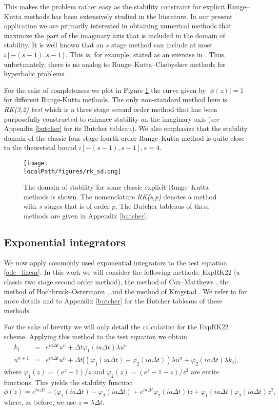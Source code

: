 This makes the problem rather easy as the stability constraint for explicit Runge--Kutta methods has been extensively studied in the literature. In our present application we are primarily interested in obtaining numerical methods that maximize the part of the imaginary axis that is included in the domain of stability. It is well known that an $s$ stage method can include at most $i [-(s-1),s-1]$. This is, for example, stated as an exercise in \cite[Chapter. IV.2, exercise 3]{Hairer:1996}. Thus, unfortunately, there is no analog to Runge--Kutta--Chebyshev methods for hyperbolic problems.

For the sake of completeness we plot in Figure \ref{fig:RK_sd2} the curve given by $|\phi(z)| = 1$ for different Runge-Kutta methods. 
The only non-standard method here is \textit{RK(3,2) best} which is a three stage second order method that has been purposefully constructed to enhance stability on the imaginary axis (see Appendix \ref{butcher} for its Butcher tableau). We also emphasize that the stability domain of the classic four stage fourth order Runge--Kutta method is quite close to the theoretical bound $i [-(s-1),s-1], s=4$.

\begin{figure}[h]
	\centering
	\texttt{[image: \\localPath/figures/rk\_sd.png]}
    \caption{The domain of stability for some classic explicit Runge--Kutta methods is shown. The nomenclature \textit{RK(s,p)} denotes a method with $s$ stages that is of order $p$. The Butcher tableaus of these methods are given in Appendix \ref{butcher}.
    }
	\label{fig:RK_sd2}
\end{figure}


\subsection{Exponential integrators}

We now apply commonly used exponential integrators to the test equation \eqref{ode_linear}. In this work we will consider the following methods: ExpRK22 (a classic two stage second order method), the method of Cox--Matthews \cite{Cox:2002}, the method of Hochbruck--Ostermann  \cite{Hochbruck:2005}, and the method of Krogstad \cite{Krogstad:2005}. We refer to \cite{Hochbruck:2010} for more details and to Appendix \ref{butcher} for the Butcher tableaus of these methods. 

For the sake of brevity we will only detail the calculation for the ExpRK22 scheme. Applying this method to the test equation we obtain
\begin{eqnarray*}
k_1&=&e^{ia\Delta t}u^n + \Delta t\varphi_1(ia\Delta t)\lambda u^n\nonumber\\
u^{n+1}&=& e^{ia\Delta t}u^n + \Delta t \Big[ (\varphi_1(ia\Delta t)-\varphi_2(ia\Delta t))\lambda u^n + \varphi_2(ia\Delta t)\lambda k_1\Big], 
\end{eqnarray*}
where $\varphi_1(z)=(e^{z}-1)/z$ and $\varphi_2(z)=(e^{z}-1-z)/z^2$ are entire functions. This yields the stability function
\[ \phi(z) = e^{ia\Delta t} + \Big(\varphi_1(ia\Delta t)-\varphi_2(ia\Delta t)+e^{ia\Delta t}\varphi_2(ia\Delta t)\Big)z + \varphi_1(ia\Delta t)\varphi_2(ia\Delta t)z^2, \]
where, as before, we use $z=\lambda \Delta t$.

